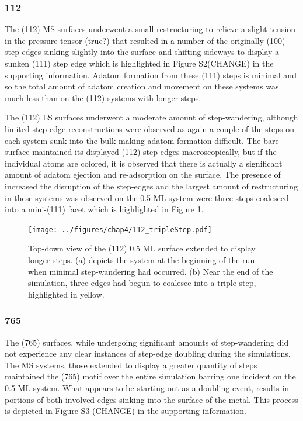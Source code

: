 \subsubsection{112}
The (112) MS surfaces underwent a small restructuring to relieve a slight
tension in the pressure tensor (true?) that resulted in a number of the
originally (100) step edges sinking slightly into the surface and shifting
sideways to display a sunken (111) step edge which is highlighted in Figure
S2(CHANGE) in  the supporting information.  Adatom formation from these (111)
steps is minimal and so the total amount of adatom creation and movement on
these systems was much less than on the (112) systems with longer steps. 

The (112) LS surfaces underwent a moderate amount of step-wandering, although
limited step-edge reconstructions were observed as again a couple of the steps
on each system sunk into the bulk making adatom formation difficult.  The bare
surface maintained its displayed (112) step-edges macroscopically, but if the
individual atoms are colored, it is observed that there is actually a
significant amount of adatom ejection and re-adsorption on the surface. The
presence of  increased the disruption of the step-edges and the largest
amount of restructuring in these systems was observed on the 0.5 ML system were
three steps coalesced into a mini-(111) facet which is highlighted in Figure
\ref{fig:tripleStep}.

\begin{figure}
\centering
  \texttt{[image: ../figures/chap4/112\_tripleStep.pdf]}
  \caption{Top-down view of the (112) 0.5 ML surface extended to display longer
steps. (a) depicts the system at the beginning of the run when minimal
step-wandering had occurred. (b) Near the end of the simulation, three edges
had begun to coalesce into a triple step, highlighted in yellow.}
  \label{fig:tripleStep}
\end{figure}

\subsubsection{765}
The (765) surfaces, while undergoing significant amounts of step-wandering did
not experience any clear instances of step-edge doubling during the
simulations. The MS systems, those extended to display a greater quantity of
steps maintained the (765) motif over the entire simulation barring one
incident on the 0.5 ML system. What appears to be starting out as a doubling
event, results in portions of both involved edges sinking into the surface of
the metal. This process is depicted in Figure S3 (CHANGE) in the supporting
information.

